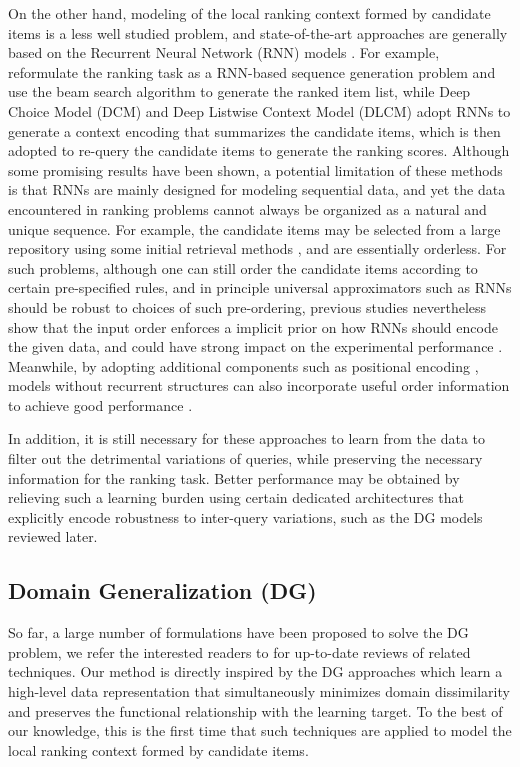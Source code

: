 \documentclass[letterpaper]{article}
\begin{document}
On the other hand, modeling of the local ranking context formed by candidate items is a less well studied problem, and state-of-the-art approaches are generally based on the Recurrent Neural Network (RNN) models \cite{DCM,ai2018learning,zhuang2018globally}. For example, \cite{zhuang2018globally} reformulate the ranking task as a RNN-based sequence generation problem and use the beam search algorithm to generate the ranked item list, while Deep Choice Model (DCM) \cite{DCM} and Deep Listwise Context Model (DLCM) \cite{ai2018learning} adopt RNNs to generate a context encoding that summarizes the candidate items, which is then adopted to re-query the candidate items to generate the ranking scores. Although some promising results have been shown, a potential limitation of these methods is that RNNs are mainly designed for modeling sequential data, and yet the data encountered in ranking problems cannot always be organized as a natural and unique sequence. For example, the candidate items may be selected from a large repository using some initial retrieval methods \cite{covington2016deep,YahooL2R}, and are essentially orderless. For such problems, although one can still order the candidate items according to certain pre-specified rules, and in principle universal approximators such as RNNs should be robust to choices of such pre-ordering, previous studies nevertheless show that the input order enforces a implicit prior on how RNNs should encode the given data, and could have strong impact on the experimental performance \cite{OrderMatters}. Meanwhile, by adopting additional components such as positional encoding \cite{vaswani2017attention}, models without recurrent structures can also incorporate useful order information to achieve good performance \cite{vaswani2017attention,gehring2017convolutional,ATRANK}.

In addition, it is still necessary for these approaches to learn from the data to filter out the detrimental variations of queries, while preserving the necessary information for the ranking task. Better performance may be obtained by relieving such a learning burden using certain dedicated architectures that explicitly encode robustness to inter-query variations, such as the DG models reviewed later.

\subsection{Domain Generalization (DG)}

So far, a large number of formulations have been proposed to solve the DG problem, we refer the interested readers to \cite{li2018learning,shankar2018generalizing} for up-to-date reviews of related techniques. Our method is directly inspired by the DG approaches which learn a high-level data representation that simultaneously minimizes domain dissimilarity and preserves the functional relationship with the learning target. To the best of our knowledge, this is the first time that such techniques are applied to model the local ranking context formed by candidate items.
\end{document}
